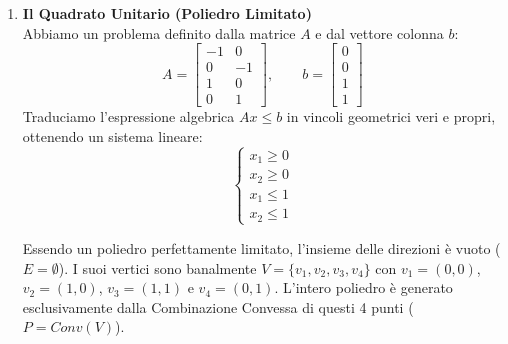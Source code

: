 \documentclass[12pt, a4paper]{article}
\begin{document}
	\begin{enumerate}[label=\textbf{Esercizio \arabic*:}, itemsep=15pt, parsep=5pt, leftmargin=*]
		
		\item \textbf{Il Quadrato Unitario (Poliedro Limitato)}\\
		Abbiamo un problema definito dalla matrice $A$ e dal vettore colonna $b$:
		\[
		A = \begin{bmatrix} 
			-1 & 0 \\ 
			0 & -1 \\ 
			1 & 0 \\ 
			0 & 1 
		\end{bmatrix}, \qquad 
		b = \begin{bmatrix} 
			0 \\ 
			0 \\ 
			1 \\ 
			1 
		\end{bmatrix}
		\]
		Traduciamo l'espressione algebrica $Ax \leq b$ in vincoli geometrici veri e propri, ottenendo un sistema lineare:
		\[
		\begin{cases}
			x_1 \geq 0 \\
			x_2 \geq 0 \\
			x_1 \leq 1 \\
			x_2 \leq 1
		\end{cases}
		\]
		
		Essendo un poliedro perfettamente limitato, l'insieme delle direzioni è vuoto ($E = \emptyset$). I suoi vertici sono banalmente $V = \{v_1, v_2, v_3, v_4\}$ con $v_1=(0,0)$, $v_2=(1,0)$, $v_3=(1,1)$ e $v_4=(0,1)$. L'intero poliedro è generato esclusivamente dalla Combinazione Convessa di questi 4 punti ($P = Conv(V)$).
		
		\begin{figure}[H]
			\centering
\end{figure}
\end{enumerate}
\end{document}
